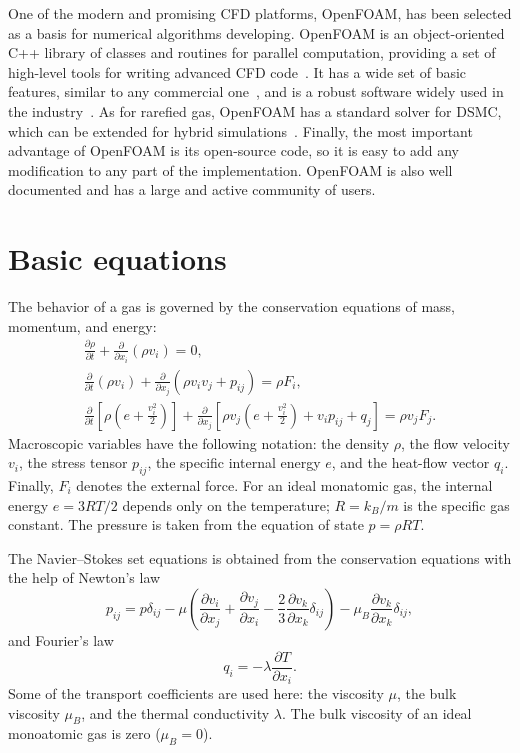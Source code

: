 \documentclass[smallextended, final]{svjour3} %
\newcommand{\pder}[2][]{\frac{\partial#1}{\partial#2}}
\begin{document}
One of the modern and promising CFD platforms, OpenFOAM\textregistered{},
has been selected as a basis for numerical algorithms developing.
OpenFOAM\textregistered{} is an object-oriented C++ library of classes and routines for parallel computation,
providing a set of high-level tools for writing advanced CFD code~\cite{OpenFOAM1998}.
It has a wide set of basic features, similar to any commercial one~\cite{OpenFOAM2010},
and is a robust software widely used in the industry~\cite{BoilingFlows2009,
TurbulentCombustion2011, CoastalEngineering2013, BiomassPyrolysis2013}.
As for rarefied gas, OpenFOAM\textregistered{} has a standard solver for DSMC, which
can be extended for hybrid simulations~\cite{HybridSolver2014}.
Finally, the most important advantage of OpenFOAM\textregistered{} is its open-source code,
so it is easy to add any modification to any part of the implementation.
OpenFOAM\textregistered{} is also well documented and has a large and active community of users.

\section{Basic equations}

The behavior of a gas is governed by the conservation equations of mass, momentum, and energy:
\begin{gather}
    \pder[\rho]{t} + \pder{x_i}(\rho v_i) = 0, \label{eq:mass}\\
    \pder{t}(\rho v_i) + \pder{x_j}(\rho v_i v_j + p_{ij}) = \rho F_i, \label{eq:momentum}\\
    \pder{t}\left[\rho\left(e+\frac{v_i^2}2\right)\right] +
        \pder{x_j}\left[\rho v_j\left(e+\frac{v_i^2}2\right)+v_i p_{ij}+q_j\right] = \rho v_j F_j. \label{eq:energy}
\end{gather}
Macroscopic variables have the following notation: the density \(\rho\), the flow velocity \(v_i\),
the stress tensor \(p_{ij}\), the specific internal energy \(e\), and the heat-flow vector \(q_i\).
Finally, \(F_i\) denotes the external force.
For an ideal monatomic gas, the internal energy \(e = 3RT/2\) depends only on the temperature;
\(R = k_B / m\) is the specific gas constant.
The pressure is taken from the equation of state \( p = \rho RT \).

The Navier--Stokes set equations is obtained from the conservation equations with the help of Newton's law
\begin{equation}\label{eq:Newton_law}
    p_{ij} = p\delta_{ij} - \mu\left(\pder[v_i]{x_j}+\pder[v_j]{x_i}-\frac23\pder[v_k]{x_k}\delta_{ij}\right) -
        \mu_B\pder[v_k]{x_k}\delta_{ij},
\end{equation}
and Fourier's law
\begin{equation}\label{eq:Fourier_law}
    q_i = -\lambda\pder[T]{x_i}.
\end{equation}
Some of the transport coefficients are used here:
the viscosity \(\mu\), the bulk viscosity \(\mu_B\), and the thermal conductivity \(\lambda\).
The bulk viscosity of an ideal monoatomic gas is zero (\(\mu_B = 0\)).
\end{document}
